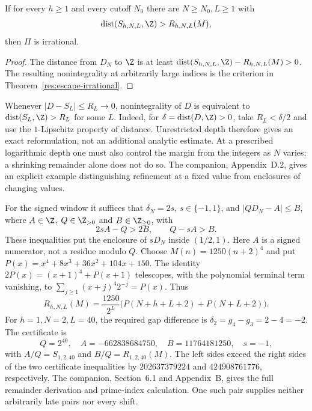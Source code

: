 \documentclass[11pt]{article}
\begin{document}
\begin{proposition}\label{res:truncation}
If for every $h\ge1$ and every cutoff $N_0$ there are $N\ge N_0,L\ge1$ with
\begin{equation}\label{eq:truncation}
 \operatorname{dist}(S_{h,N,L},\Z)>R_{h,N,L}(M),
\end{equation}
then $\Pi$ is irrational.
\end{proposition}
\begin{proof}
The distance from $D_N$ to $\Z$ is at least
$\operatorname{dist}(S_{h,N,L},\Z)-R_{h,N,L}(M)>0$.
The resulting nonintegrality at arbitrarily large indices is the
criterion in Theorem~\ref{res:escape-irrational}.
\end{proof}

\begin{remark}\label{res:complete-truncation}
Whenever $|D-S_L|\le R_L\to0$, nonintegrality of $D$ is equivalent to
$\operatorname{dist}(S_L,\Z)>R_L$ for some $L$.  Indeed, for
$\delta=\operatorname{dist}(D,\Z)>0$, take $R_L<\delta/2$ and use the
$1$-Lipschitz property of distance.  Unrestricted depth therefore gives
an exact reformulation, not an additional analytic estimate.  At a
prescribed logarithmic depth one must also control the margin from the
integers as $N$ varies; a shrinking remainder alone does not do so.
The companion, Appendix~D.2, gives an explicit example distinguishing
refinement at a fixed value from enclosures of changing values.
\end{remark}

For the signed window it suffices that $\delta_N=2s$, $s\in\{-1,1\}$,
and $|QD_N-A|\le B$, where $A\in\Z$, $Q\in\Z_{>0}$ and
$B\in\Z_{\ge0}$, with
\[
 2sA-Q>2B,\qquad Q-sA>B.
\]
These inequalities put the enclosure of $sD_N$ inside $(1/2,1)$.
Here $A$ is a signed numerator, not a residue modulo $Q$.
Choose $M(n)=1250(n+2)^4$ and put
$P(x)=x^4+8x^3+36x^2+104x+150$.  The identity
$2P(x)=(x+1)^4+P(x+1)$ telescopes, with the polynomial terminal term
vanishing, to $\sum_{j\ge1}(x+j)^4 2^{-j}=P(x)$.  Thus
\[
 R_{h,N,L}(M)=\frac{1250}{2^L}
     \bigl(P(N+h+L+2)+P(N+L+2)\bigr).
\]
For $h=1,N=2,L=40$, the required gap difference is
$\delta_2=g_4-g_3=2-4=-2$.  The certificate is
\[
 Q=2^{40},\quad A=-662838684750,\quad B=11764181250,\quad s=-1,
\]
with $A/Q=S_{1,2,40}$ and $B/Q=R_{1,2,40}(M)$.  The left sides exceed
the right sides of the two certificate inequalities by
$202637379224$ and $424908761776$, respectively.  The companion, Section~6.1 and
Appendix~B, gives the full remainder derivation and prime-index calculation.
One such pair supplies neither arbitrarily late pairs nor every shift.
\end{document}
